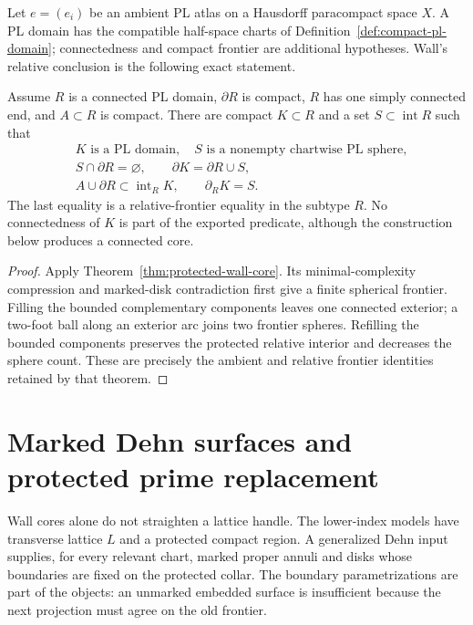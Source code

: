 Let $e=(e_i)$ be an ambient PL atlas on a Hausdorff paracompact space $X$.
A PL domain has the compatible half-space charts of
Definition~\ref{def:compact-pl-domain}; connectedness and compact frontier
are additional hypotheses. Wall's relative conclusion is the
following exact statement.

\begin{proposition}
\label{prop:wall-core}
Assume $R$ is a connected PL domain, $\partial R$ is compact, $R$ has one
simply connected end, and $A\subset R$ is compact.  There are compact
$K\subset R$ and a set $S\subset\operatorname{int}R$ such that
\begin{align*}
 &K\text{ is a PL domain},\quad S\text{ is a nonempty chartwise PL sphere},\\
 &S\cap\partial R=\varnothing,\qquad
   \partial K=\partial R\cup S,\\
 &A\cup\partial R\subset\operatorname{int}_R K,\qquad
   \partial_R K=S.
\end{align*}
The last equality is a relative-frontier equality in the subtype $R$.
No connectedness of $K$ is part of the exported predicate, although the
construction below produces a connected core.
\end{proposition}

\begin{proof}
Apply Theorem~\ref{thm:protected-wall-core}. Its minimal-complexity
compression and marked-disk contradiction first give a finite spherical
frontier. Filling the bounded complementary components leaves one connected
exterior; a two-foot ball along an exterior arc joins two frontier spheres.
Refilling the bounded components preserves the protected relative interior
and decreases the sphere count. These are precisely the ambient and
relative frontier identities retained by that theorem.
\end{proof}

\section{Marked Dehn surfaces and protected prime replacement}
\label{sec:dehn-prime}

Wall cores alone do not straighten a lattice handle.  The lower-index
models have transverse lattice $L$ and a protected compact region.  A
generalized Dehn input supplies, for every relevant chart, marked proper
annuli and disks whose boundaries are fixed on the protected collar.  The
boundary parametrizations are part of the objects: an unmarked embedded
surface is insufficient because the next projection must agree on the old
frontier.

